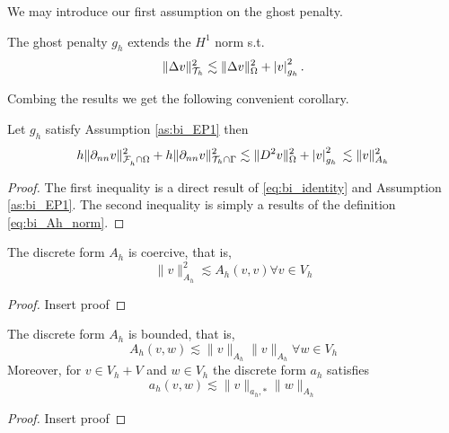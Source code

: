 We may introduce our first assumption on the ghost penalty.
\begin{assumption}[EP1]
    \label{as:bi_EP1}
    The ghost penalty $g_{h}$ extends the $H^{1}$ norm s.t. \[
    \| \Delta  v \|_{ \mathcal{T} _{h} }^{ 2 } \lesssim  \| \Delta  v \|_{ \Omega  }^{ 2 } + \left\lvert  v  \right\rvert _{g_{h}}^{2}.
    \]
\end{assumption}
Combing the results we get the following convenient corollary.

\begin{corollary}
    \label{cor:bi_inverse_thm}
    Let $g_{h}$ satisfy Assumption \ref{as:bi_EP1} then
    \[
            h\| \partial _{nn}  v \|_{ \mathcal{F}_h^{} \cap \Omega    }^{2 } + h\| \partial _{nn} v \|_{ \mathcal{T} _{h} \cap \Gamma  }^{2  }   \lesssim  \| D^2 v \|_{ \Omega  }^{ 2 } + \left\lvert  v  \right\rvert _{g_{h}}^{2} \\
              \lesssim \| v \|_{ A_{h} }^{  2}
    \]
\end{corollary}
\begin{proof}
    The first inequality is a direct result of \eqref{eq:bi_identity} and Assumption \ref{as:bi_EP1}. The second inequality is simply a results of the definition \eqref{eq:bi_Ah_norm}.
\end{proof}

\begin{lemma}
    \label{lemma:bi_Ah_coercive}
    The discrete form $A_{h}$ is coercive, that is, \[
    \| v \|_{ A_{h} }^{ 2 }  \lesssim A_{h}( v,v) \forall v \in V_{h}
    \]
\end{lemma}

\begin{proof}
    Insert proof
\end{proof}

\begin{lemma}
    \label{lemma:bi_Ah_bounded}
    The discrete form $A_{h}$ is bounded, that is,
    \begin{equation}
    \label{eq:bi_A_h_bounded}
     A_{h}( v,w) \lesssim \| v \|_{A_{h}  }^{  }\| v \|_{A_{h}  }^{  }  \forall w \in V_{h}
    \end{equation}
    Moreover, for $v \in V_{h} + V$  and $w \in V_{h}$ the discrete form $a_{h}$ satisfies
    \begin{equation}
        \label{eq:bi_a_h_bounded}
        a_{h} ( v,w) \lesssim \| v \|_{ a_{h},* }^{  } \| w \|_{ A_{h} }^{  }
    \end{equation}
\end{lemma}

\begin{proof}
    Insert proof
\end{proof}





